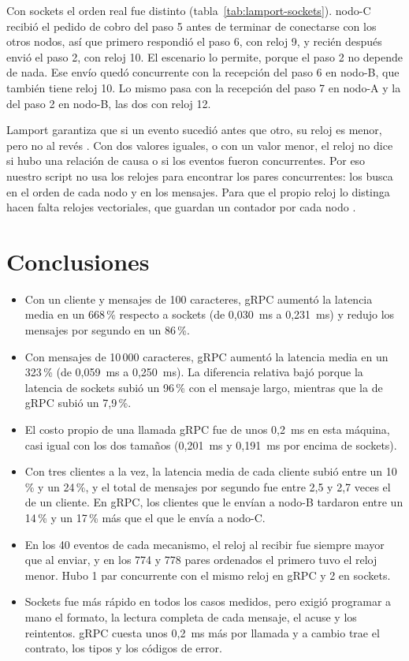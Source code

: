 \documentclass[11pt,a4paper]{article}
\begin{document}
Con sockets el orden real fue distinto (tabla~\ref{tab:lamport-sockets}). nodo-C recibió el pedido de cobro del paso 5 antes de terminar de conectarse con los otros nodos, así que primero respondió el paso 6, con reloj 9, y recién después envió el paso 2, con reloj 10. El escenario lo permite, porque el paso 2 no depende de nada. Ese envío quedó concurrente con la recepción del paso 6 en nodo-B, que también tiene reloj 10. Lo mismo pasa con la recepción del paso 7 en nodo-A y la del paso 2 en nodo-B, las dos con reloj 12.

Lamport garantiza que si un evento sucedió antes que otro, su reloj es menor, pero no al revés \cite{lamport1978}. Con dos valores iguales, o con un valor menor, el reloj no dice si hubo una relación de causa o si los eventos fueron concurrentes. Por eso nuestro script no usa los relojes para encontrar los pares concurrentes: los busca en el orden de cada nodo y en los mensajes. Para que el propio reloj lo distinga hacen falta relojes vectoriales, que guardan un contador por cada nodo \cite{vansteen2023}.

\section{Conclusiones}

\begin{itemize}[leftmargin=*]
  \item Con un cliente y mensajes de 100 caracteres, gRPC aumentó la latencia media en un 668\,\% respecto a sockets (de 0,030~ms a 0,231~ms) y redujo los mensajes por segundo en un 86\,\%.
  \item Con mensajes de 10\,000 caracteres, gRPC aumentó la latencia media en un 323\,\% (de 0,059~ms a 0,250~ms). La diferencia relativa bajó porque la latencia de sockets subió un 96\,\% con el mensaje largo, mientras que la de gRPC subió un 7,9\,\%.
  \item El costo propio de una llamada gRPC fue de unos 0,2~ms en esta máquina, casi igual con los dos tamaños (0,201~ms y 0,191~ms por encima de sockets).
  \item Con tres clientes a la vez, la latencia media de cada cliente subió entre un 10\,\% y un 24\,\%, y el total de mensajes por segundo fue entre 2,5 y 2,7 veces el de un cliente. En gRPC, los clientes que le envían a nodo-B tardaron entre un 14\,\% y un 17\,\% más que el que le envía a nodo-C.
  \item En los 40 eventos de cada mecanismo, el reloj al recibir fue siempre mayor que al enviar, y en los 774 y 778 pares ordenados el primero tuvo el reloj menor. Hubo 1 par concurrente con el mismo reloj en gRPC y 2 en sockets.
  \item Sockets fue más rápido en todos los casos medidos, pero exigió programar a mano el formato, la lectura completa de cada mensaje, el acuse y los reintentos. gRPC cuesta unos 0,2~ms más por llamada y a cambio trae el contrato, los tipos y los códigos de error.
\end{itemize}
\end{document}
